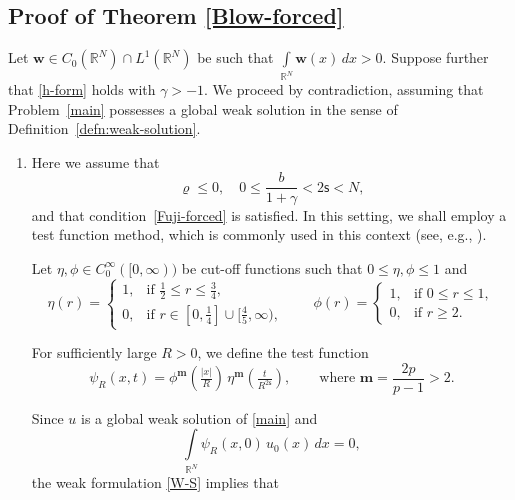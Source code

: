 \documentclass[12pt,reqno]{amsart}
\theoremstyle{plain}
\theoremstyle{definition}
\theoremstyle{remark}
\numberwithin{equation}{section}
\newcommand{\R}{\mathbb R}
\newcommand{\bw}{\mathbf{w}}
\newcommand{\ts}{\mathsf{s}}
\begin{document}
\subsection{Proof of Theorem \ref{Blow-forced}}  
Let $\bw \in C_0(\mathbb{R}^{N}) \cap L^{1}(\mathbb{R}^{N})$ be such that $\int\limits_{\mathbb{R}^N} \bw(x)\,dx > 0$. Suppose further that \eqref{h-form} holds with $\gamma > -1$. We proceed by contradiction, assuming that Problem~\eqref{main} possesses a global weak solution in the sense of Definition~\ref{defn:weak-solution}.
\begin{enumerate}[label=(\roman*)]
\item Here we assume that
$$
    \varrho \leq 0,\quad 0 \leq \frac{b}{1+\gamma} < 2\ts < N,
$$
and that condition~\eqref{Fuji-forced} is satisfied.  
In this setting, we shall employ a test function method, which is commonly used in this context 
(see, e.g., \cite{Beri-arXiv, Kirane0, Kirane1, Kirane2, JKS, MM, Majd, ES}).


Let $\eta, \phi \in C^{\infty}_{0}([0,\infty))$ be cut-off functions such that $0 \leq \eta, \phi \leq 1$ and 
$$
\eta(r) = 
\begin{cases}
1, & \text{if } \tfrac{1}{2} \leq r \leq \tfrac{3}{4}, \\[4pt]
0, & \text{if } r \in [0,\tfrac{1}{4}] \cup [\tfrac{4}{5}, \infty),
\end{cases}
\qquad
\phi(r) = 
\begin{cases}
1, & \text{if } 0 \leq r \leq 1, \\[4pt]
0, & \text{if } r \geq 2.
\end{cases}
$$

For sufficiently large $R > 0$, we define the test function
\begin{equation}
    \label{test-func1}
    \psi_{R}(x,t) = 
    \phi^{\mathbf{m}}\!\left(\tfrac{|x|}{R}\right)\,
    \eta^{\mathbf{m}}\!\left(\tfrac{t}{R^{2\ts}}\right),
    \qquad \text{where } \mathbf{m} = \frac{2p}{p-1} > 2.
\end{equation}

Since $u$ is a global weak solution of \eqref{main} and 
$$
\int\limits_{\R^N} \psi_{R}(x,0)\, u_0(x) \, dx = 0,
$$
the weak formulation \eqref{W-S} implies that


\end{enumerate}
\end{document}
